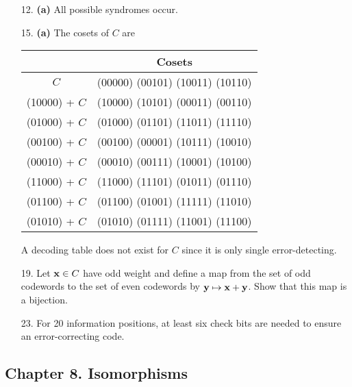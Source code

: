{\begin{itemize}
 
\bf\item[12.]\rm
{\bf (a)} All possible syndromes occur.
 
 
\bf\item[15.]\rm
{\bf (a)} The cosets of $C$ are 
\begin{center}
\begin{tabular}{|c|c|}
\hline
 & Cosets \\
\hline
          $C$ & (00000)  (00101)  (10011)  (10110) \\
(10000) + $C$ & (10000)  (10101)  (00011)  (00110) \\
(01000) + $C$ & (01000)  (01101)  (11011)  (11110) \\
(00100) + $C$ & (00100)  (00001)  (10111)  (10010) \\
(00010) + $C$ & (00010)  (00111)  (10001)  (10100) \\
(11000) + $C$ & (11000)  (11101)  (01011)  (01110) \\
(01100) + $C$ & (01100)  (01001)  (11111)  (11010) \\
(01010) + $C$ & (01010)  (01111)  (11001)  (11100) \\
\hline
\end{tabular}
\end{center}
A decoding table does not exist for $C$ since it is only single
error-detecting.  
 
\bf\item[19.]\rm
Let ${\bold x} \in C$ have odd weight and define a map from the set of
odd codewords to the set of even codewords by ${\bold y} \mapsto
{\bold x} + {\bold y}$. Show that this map is a bijection.
 
 
\bf\item[23.]\rm
For 20 information positions, at least six check bits are needed to
ensure an error-correcting code.
 
\end{itemize}
}
 
\subsection*{Chapter 8. Isomorphisms}
 
